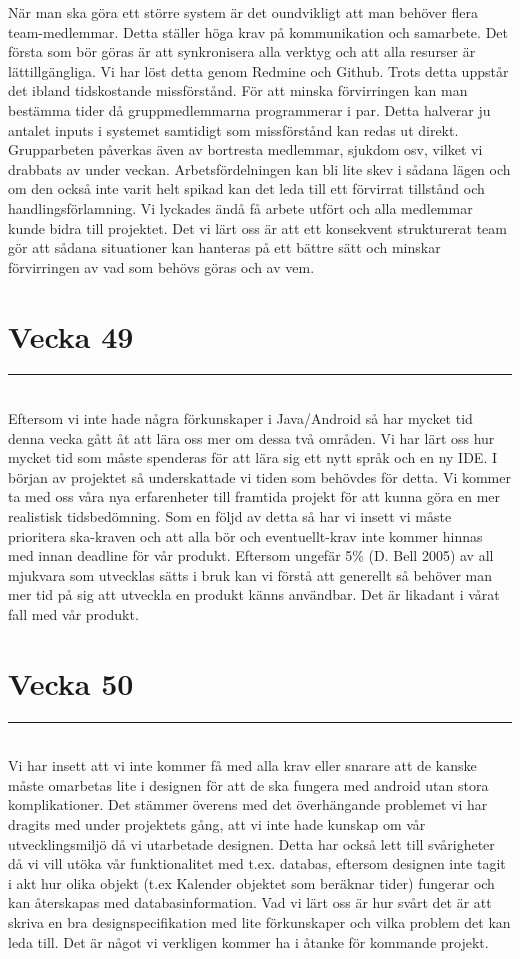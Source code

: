 \documentclass{article}
\newcommand{\HRule}{\rule{\linewidth}{0.5mm}}
\begin{document}
När man ska göra ett större system är det oundvikligt att man behöver flera team-medlemmar.
Detta ställer höga krav på kommunikation och samarbete. Det första som bör göras är att synkronisera alla verktyg och att alla resurser är lättillgängliga.
Vi har löst detta genom Redmine och Github. Trots detta uppstår det ibland tidskostande missförstånd. För att minska förvirringen kan man bestämma tider då gruppmedlemmarna programmerar i par.
Detta halverar ju antalet inputs i systemet samtidigt som missförstånd kan redas ut direkt.
Grupparbeten påverkas även av bortresta medlemmar, sjukdom osv, vilket vi drabbats av under veckan.
Arbetsfördelningen kan bli lite skev i sådana lägen och om den också inte varit helt spikad kan det leda till ett förvirrat tillstånd och handlingsförlamning.
Vi lyckades ändå få arbete utfört och alla medlemmar kunde bidra till projektet.
Det vi lärt oss är att ett konsekvent strukturerat team gör att sådana situationer kan hanteras på ett bättre sätt och minskar förvirringen av vad som behövs göras och av vem.

\section*{ {\center Vecka 49} }
\HRule \\[2 cm]

Eftersom vi inte hade några förkunskaper i Java/Android så har mycket tid denna vecka gått åt att lära oss mer om dessa två områden. Vi har lärt oss hur mycket tid som måste spenderas för att lära sig ett nytt språk och en ny IDE.
I början av projektet så underskattade vi tiden som behövdes för detta. Vi kommer ta med oss våra nya erfarenheter till framtida projekt för att kunna göra en mer realistisk tidsbedömning.
Som en följd av detta så har vi insett vi måste prioritera ska-kraven och att alla bör och eventuellt-krav inte kommer hinnas med innan deadline för vår produkt.
Eftersom ungefär 5\% (D. Bell 2005) av all mjukvara som utvecklas sätts i bruk kan vi förstå att generellt så behöver man mer tid på sig att utveckla en produkt känns användbar. Det är likadant i vårat fall med vår produkt.

\section*{ {\center Vecka 50} }
\HRule \\[2 cm]

Vi har insett att vi inte kommer få med alla krav eller snarare att de kanske måste omarbetas lite i designen för att de ska fungera med android utan stora komplikationer. Det stämmer överens med det överhängande problemet vi har dragits med under projektets gång, att vi inte hade kunskap om vår utvecklingsmiljö då vi utarbetade designen. 
Detta har också lett till svårigheter då vi vill utöka vår funktionalitet med t.ex. databas, eftersom designen inte tagit i akt hur olika objekt (t.ex Kalender objektet som beräknar tider) fungerar och kan återskapas med databasinformation. 
Vad vi lärt oss är hur svårt det är att skriva en bra designspecifikation med lite förkunskaper och vilka problem det kan leda till. Det är något vi verkligen kommer ha i åtanke för kommande projekt.
\end{document}
